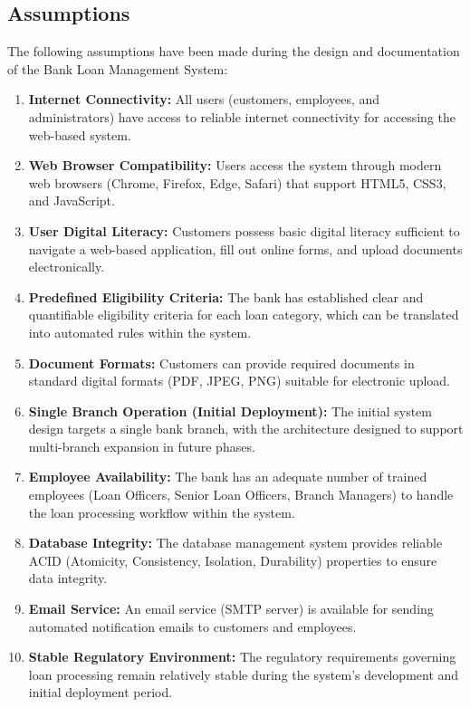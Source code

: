 \documentclass[12pt,a4paper,oneside]{report}
\begin{document}
\subsection{Assumptions}

The following assumptions have been made during the design and documentation of the Bank Loan Management System:

\begin{enumerate}
  \item \textbf{Internet Connectivity:} All users (customers, employees, and administrators) have access to reliable internet connectivity for accessing the web-based system.
  \item \textbf{Web Browser Compatibility:} Users access the system through modern web browsers (Chrome, Firefox, Edge, Safari) that support HTML5, CSS3, and JavaScript.
  \item \textbf{User Digital Literacy:} Customers possess basic digital literacy sufficient to navigate a web-based application, fill out online forms, and upload documents electronically.
  \item \textbf{Predefined Eligibility Criteria:} The bank has established clear and quantifiable eligibility criteria for each loan category, which can be translated into automated rules within the system.
  \item \textbf{Document Formats:} Customers can provide required documents in standard digital formats (PDF, JPEG, PNG) suitable for electronic upload.
  \item \textbf{Single Branch Operation (Initial Deployment):} The initial system design targets a single bank branch, with the architecture designed to support multi-branch expansion in future phases.
  \item \textbf{Employee Availability:} The bank has an adequate number of trained employees (Loan Officers, Senior Loan Officers, Branch Managers) to handle the loan processing workflow within the system.
  \item \textbf{Database Integrity:} The database management system provides reliable ACID (Atomicity, Consistency, Isolation, Durability) properties to ensure data integrity.
  \item \textbf{Email Service:} An email service (SMTP server) is available for sending automated notification emails to customers and employees.
  \item \textbf{Stable Regulatory Environment:} The regulatory requirements governing loan processing remain relatively stable during the system's development and initial deployment period.
\end{enumerate}
\end{document}
